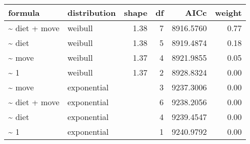 \begin{table}[ht]
\centering
\begin{tabular}{llrrrr}
 formula & distribution & shape & df & AICc & weight \\ 
  \hline
\~{} diet + move & weibull & 1.38 & 7 & 8916.5760 & 0.77 \\ 
  \~{} diet & weibull & 1.38 & 5 & 8919.4874 & 0.18 \\ 
  \~{} move & weibull & 1.37 & 4 & 8921.9855 & 0.05 \\ 
  \~{} 1 & weibull & 1.37 & 2 & 8928.8324 & 0.00 \\ 
  \~{} move & exponential &  & 3 & 9237.3006 & 0.00 \\ 
  \~{} diet + move & exponential &  & 6 & 9238.2056 & 0.00 \\ 
  \~{} diet & exponential &  & 4 & 9239.4547 & 0.00 \\ 
  \~{} 1 & exponential &  & 1 & 9240.9792 & 0.00 \\ 
  \end{tabular}
\label{tab:er}
\end{table}
